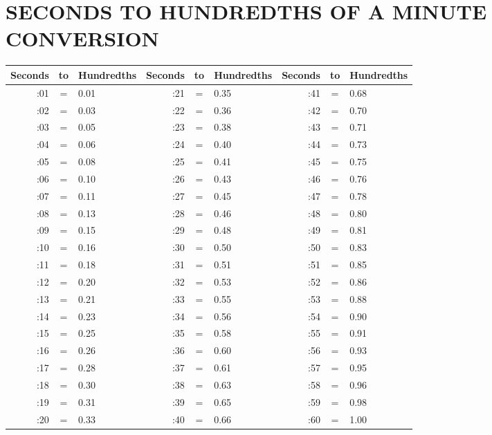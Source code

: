\section{SECONDS TO HUNDREDTHS OF A MINUTE CONVERSION}
\begin{tabular}{ |r|c|l|r|c|l|r|c|l| }
  \hline
  Seconds & to & Hundredths & Seconds & to & Hundredths & Seconds & to & Hundredths \\
  \hline
  :01 & = & 0.01 & :21 & = & 0.35 & :41 & = & 0.68 \\
  :02 & = & 0.03 & :22 & = & 0.36 & :42 & = & 0.70 \\
  :03 & = & 0.05 & :23 & = & 0.38 & :43 & = & 0.71 \\
  :04 & = & 0.06 & :24 & = & 0.40 & :44 & = & 0.73 \\
  :05 & = & 0.08 & :25 & = & 0.41 & :45 & = & 0.75 \\
  :06 & = & 0.10 & :26 & = & 0.43 & :46 & = & 0.76 \\
  :07 & = & 0.11 & :27 & = & 0.45 & :47 & = & 0.78 \\
  :08 & = & 0.13 & :28 & = & 0.46 & :48 & = & 0.80 \\
  :09 & = & 0.15 & :29 & = & 0.48 & :49 & = & 0.81 \\
  :10 & = & 0.16 & :30 & = & 0.50 & :50 & = & 0.83 \\
  :11 & = & 0.18 & :31 & = & 0.51 & :51 & = & 0.85 \\
  :12 & = & 0.20 & :32 & = & 0.53 & :52 & = & 0.86 \\
  :13 & = & 0.21 & :33 & = & 0.55 & :53 & = & 0.88 \\
  :14 & = & 0.23 & :34 & = & 0.56 & :54 & = & 0.90 \\
  :15 & = & 0.25 & :35 & = & 0.58 & :55 & = & 0.91 \\
  :16 & = & 0.26 & :36 & = & 0.60 & :56 & = & 0.93 \\
  :17 & = & 0.28 & :37 & = & 0.61 & :57 & = & 0.95 \\
  :18 & = & 0.30 & :38 & = & 0.63 & :58 & = & 0.96 \\
  :19 & = & 0.31 & :39 & = & 0.65 & :59 & = & 0.98 \\
  :20 & = & 0.33 & :40 & = & 0.66 & :60 & = & 1.00 \\
  \hline
\end{tabular}